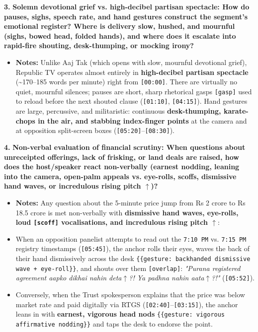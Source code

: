 \documentclass[10pt,a4paper]{article}
\begin{document}
\noindent\textbf{3.} \textbf{Solemn devotional grief vs. high-decibel partisan spectacle: How do pauses, sighs, speech rate, and hand gestures construct the segment's emotional register? Where is delivery slow, hushed, and mournful (sighs, bowed head, folded hands), and where does it escalate into rapid-fire shouting, desk-thumping, or mocking irony?}\par\smallskip
\begin{itemize}
  \item \textbf{Notes:}
Unlike Aaj Tak (which opens with slow, mournful devotional grief), Republic TV operates almost entirely in \textbf{high-decibel partisan spectacle} (\textasciitilde{}170--185 words per minute) right from \texttt{[00:00]}. There are virtually no quiet, mournful silences; pauses are short, sharp rhetorical gasps \texttt{[gasp]} used to reload before the next shouted clause (\texttt{[01:10]}, \texttt{[04:15]}). Hand gestures are large, percussive, and militaristic: continuous \textbf{desk-thumping, karate-chops in the air, and stabbing index-finger points} at the camera and at opposition split-screen boxes (\texttt{[05:20]}--\texttt{[08:30]}).\par\smallskip
\end{itemize}

\noindent\textbf{4.} \textbf{Non-verbal evaluation of financial scrutiny: When questions about unreceipted offerings, lack of frisking, or land deals are raised, how does the host/speaker react non-verbally (earnest nodding, leaning into the camera, open-palm appeals vs. eye-rolls, scoffs, dismissive hand waves, or incredulous rising pitch $\uparrow$)?}\par\smallskip
\begin{itemize}
  \item \textbf{Notes:}
Any question about the 5-minute price jump from Rs 2 crore to Rs 18.5 crore is met non-verbally with \textbf{dismissive hand waves, eye-rolls, loud \texttt{[scoff]} vocalisations, and incredulous rising pitch \texttt{$\uparrow$}}:\par\smallskip
  \item When an opposition panelist attempts to read out the \texttt{7:10 PM} vs. \texttt{7:15 PM} registry timestamps (\texttt{[05:45]}), the anchor rolls their eyes, waves the back of their hand dismissively across the desk \texttt{\{\{gesture: backhanded dismissive wave + eye-roll\}\}}, and shouts over them \texttt{[overlap]}: \textit{"Purana registered agreement aapko dikhai nahin deta$\uparrow$?! Ya padhna nahin aata$\uparrow$?!"} (\texttt{[05:52]}).
  \item Conversely, when the Trust spokesperson explains that the price was below market rate and paid digitally via RTGS (\texttt{[02:40]}--\texttt{[03:15]}), the anchor leans in with \textbf{earnest, vigorous head nods} \texttt{\{\{gesture: vigorous affirmative nodding\}\}} and taps the desk to endorse the point.
\end{itemize}
\end{document}
